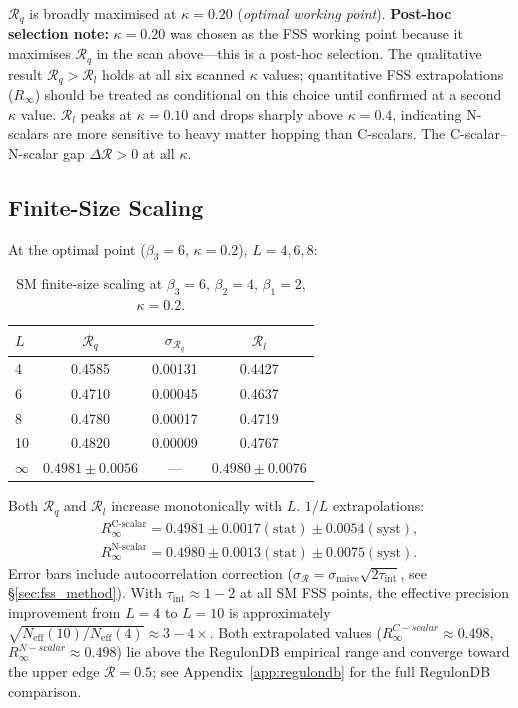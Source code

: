 \documentclass[12pt,a4paper]{article}
\newcommand{\R}{\mathcal{R}}           %
\theoremstyle{plain}
\theoremstyle{definition}
\theoremstyle{remark}
\begin{document}
$\R_q$ is broadly maximised at $\kappa=0.20$ (\emph{optimal working point}).
\textbf{Post-hoc selection note:} $\kappa=0.20$ was chosen as the FSS working point
because it maximises $\R_q$ in the scan above---this is a post-hoc selection.
The qualitative result $\R_q>\R_l$ holds at all six scanned $\kappa$ values;
quantitative FSS extrapolations ($R_\infty$) should be treated as conditional on this
choice until confirmed at a second $\kappa$ value.
$\R_l$ peaks at $\kappa=0.10$ and drops sharply above $\kappa=0.4$, indicating
N-scalars are more sensitive to heavy matter hopping than C-scalars.
The C-scalar--N-scalar gap $\Delta\R>0$ at all $\kappa$.

\subsection{Finite-Size Scaling}
\label{sec:smfss}

At the optimal point ($\beta_3=6$, $\kappa=0.2$), $L=4,6,8$:

\begin{table}[ht]
\centering
\caption{SM finite-size scaling at $\beta_3=6$, $\beta_2=4$, $\beta_1=2$, $\kappa=0.2$.}
\label{tab:sm_fss}
\begin{tabular}{lccc}
\toprule
$L$ & $\R_q$ & $\sigma_{\R_q}$ & $\R_l$ \\
\midrule
4 & 0.4585 & 0.00131 & 0.4427 \\
6 & 0.4710 & 0.00045 & 0.4637 \\
8 & 0.4780 & 0.00017 & 0.4719 \\
10 & 0.4820 & 0.00009 & 0.4767 \\
\midrule
$\infty$ & $\mathbf{0.4981\pm0.0056}$ & --- & $\mathbf{0.4980\pm0.0076}$ \\
\bottomrule
\end{tabular}
\end{table}

Both $\R_q$ and $\R_l$ increase monotonically with $L$.
$1/L$ extrapolations:
\begin{gather*}
  R_\infty^{\text{C-scalar}} = 0.4981 \pm 0.0017(\text{stat}) \pm 0.0054(\text{syst}), \\
  R_\infty^{\text{N-scalar}} = 0.4980 \pm 0.0013(\text{stat}) \pm 0.0075(\text{syst}).
\end{gather*}
Error bars include autocorrelation correction 
($\sigma_\R = \sigma_\text{naive}\sqrt{2\tau_\text{int}}$, see \S\ref{sec:fss_method}).
With $\tau_\text{int}\approx 1{-}2$ at all SM FSS points, the effective precision improvement from $L=4$ to $L=10$ is approximately $\sqrt{N_\text{eff}(10)/N_\text{eff}(4)}\approx 3{-}4\times$.
Both extrapolated values ($R_\infty^{C-scalar}\approx0.498$, $R_\infty^{N-scalar}\approx0.498$) lie above the RegulonDB empirical
range and converge toward the upper edge $\R=0.5$;
see Appendix~\ref{app:regulondb} for the full RegulonDB comparison.
\end{document}
